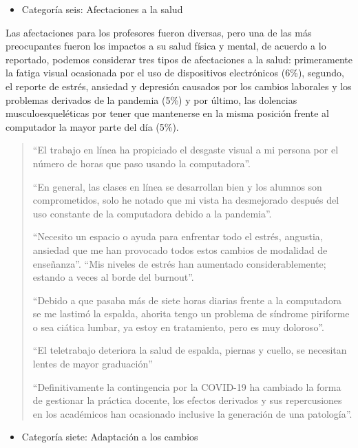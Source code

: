\documentclass[spanish]{textolivre}
\begin{document}
\begin{itemize}
 \item Categoría seis: Afectaciones a la salud
\end{itemize}

Las afectaciones para los profesores fueron diversas, pero una de las más preocupantes fueron los impactos a su salud física y mental, de acuerdo a lo reportado, podemos considerar tres tipos de afectaciones a la salud: primeramente la fatiga visual ocasionada por el uso de dispositivos electrónicos (6\%), segundo, el reporte de estrés, ansiedad y depresión causados por los cambios laborales y los problemas derivados de la pandemia (5\%) y por último, las dolencias musculoesqueléticas por tener que mantenerse en la misma posición frente al computador la mayor parte del día (5\%).
\begin{quote}
 “El trabajo en línea ha propiciado el desgaste visual a mi persona por el número de horas que paso usando la computadora”. 
 
“En general, las clases en línea se desarrollan bien y los alumnos son comprometidos, solo he notado que mi vista ha desmejorado después del uso constante de la computadora debido a la pandemia”.

“Necesito un espacio o ayuda para enfrentar todo el estrés, angustia, ansiedad que me han provocado todos estos cambios de modalidad de enseñanza”. “Mis niveles de estrés han aumentado considerablemente; estando a veces al borde del burnout”.

“Debido a que pasaba más de siete horas diarias frente a la computadora se me lastimó la espalda, ahorita tengo un problema de síndrome piriforme o sea ciática lumbar, ya estoy en tratamiento, pero es muy doloroso”. 

“El teletrabajo deteriora la salud de espalda, piernas y cuello, se necesitan lentes de mayor graduación”

“Definitivamente la contingencia por la COVID-19 ha cambiado la forma de gestionar la práctica docente, los efectos derivados y sus repercusiones en los académicos han ocasionado inclusive la generación de una patología”.
\end{quote}

\begin{itemize}
 \item Categoría siete: Adaptación a los cambios
\end{itemize}
\end{document}
